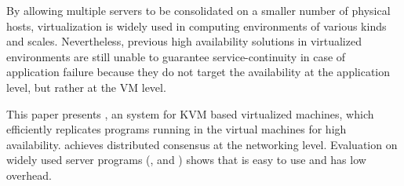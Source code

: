 By allowing multiple servers to be consolidated on a smaller number of physical 
hosts, virtualization is widely used in computing environments of various kinds and
scales. Nevertheless, previous high availability solutions in virtualized environments
are still unable to guarantee service-continuity in case of application failure because 
they do not target the availability at the application level, but rather at the VM level.

This paper presents \xxx, an \smr system for KVM based virtualized machines, which 
efficiently replicates programs running in the virtual machines for high availability.
\xxx achieves distributed consensus at the networking level. 
Evaluation on \nprog widely used server programs (\eg, \mysql and \redis) shows 
that \xxx is easy to use and has low overhead.
